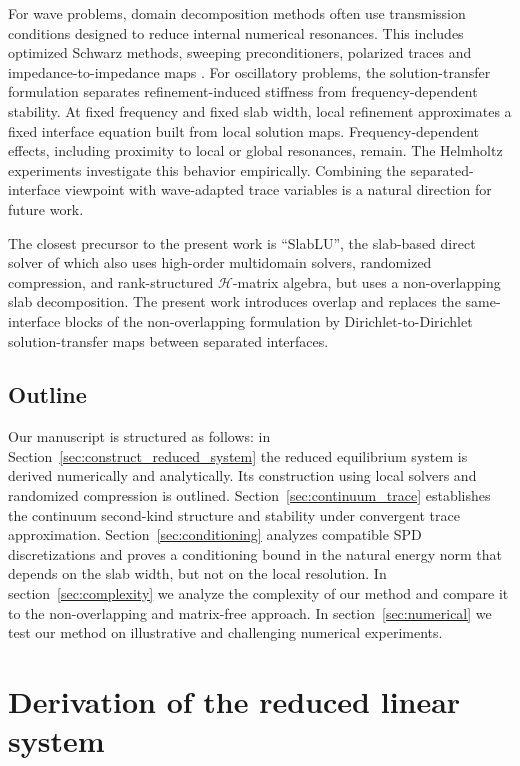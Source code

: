 \documentclass[final,onefignum,onetabnum]{siamart250211}
\theoremstyle{definition}
\begin{document}
For wave problems, domain decomposition methods often use transmission conditions designed to reduce internal numerical resonances. This includes optimized Schwarz methods, sweeping preconditioners, polarized traces and impedance-to-impedance maps \cite{sweeping_hmat,sweeping_pml,ZEPEDANUNEZ2016347,Zepeda-Nunez2019-lp,doi:10.1137/16M109781X,2013_martinsson_ItI,Despres1991}. 
For oscillatory problems, the solution-transfer formulation separates refinement-induced stiffness from frequency-dependent stability. At fixed frequency and fixed slab width, local refinement approximates a fixed interface equation built from local solution maps. Frequency-dependent effects, including proximity to local or global resonances, remain. The Helmholtz experiments investigate this behavior empirically. Combining the separated-interface viewpoint with wave-adapted trace variables is a natural direction for future work.

The closest precursor to the present work is ``SlabLU'', the slab-based direct solver of \cite{Yesypenko_2024} which also uses high-order multidomain solvers, randomized compression, and rank-structured $\mathcal{H}$-matrix algebra, but uses a non-overlapping slab decomposition. 
The present work introduces overlap and replaces the same-interface blocks of the non-overlapping formulation by Dirichlet-to-Dirichlet solution-transfer maps between separated interfaces.

\subsection{Outline}
Our manuscript is structured as follows: in Section~\ref{sec:construct_reduced_system} the reduced equilibrium system is derived numerically and analytically. Its construction using local solvers and randomized compression is outlined. Section~\ref{sec:continuum_trace} establishes the continuum second-kind structure and stability under convergent trace approximation.
Section~\ref{sec:conditioning} analyzes compatible SPD discretizations and proves a conditioning bound in the natural energy norm that depends on the slab width, but not on the local resolution.
In section~\ref{sec:complexity} we analyze the complexity of our method and compare it to the non-overlapping and matrix-free approach. In section~\ref{sec:numerical} we test our method on illustrative and challenging numerical experiments.

\section{Derivation of the reduced linear system}
\end{document}
